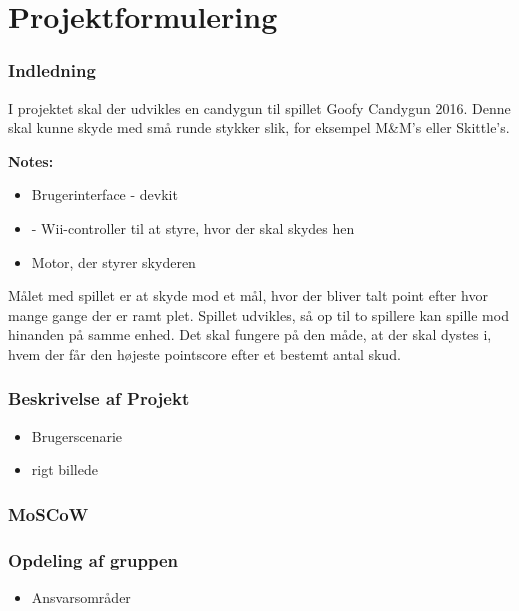 \frontmatter
\maketitle
\newpage

\tableofcontents
\newpage
\listoffigures
\newpage

\mainmatter
\chapter{Projektformulering}
\subsection{Indledning}
I projektet skal der udvikles en candygun til spillet Goofy Candygun 2016. Denne skal kunne skyde med små runde stykker slik, for eksempel M\&M’s eller Skittle’s. 

\textbf{Notes:}
\begin{itemize}
	\item{Brugerinterface - devkit}
	\item{-	Wii-controller til at styre, hvor der skal skydes hen}
	\item{Motor, der styrer skyderen}
\end{itemize}

Målet med spillet er at skyde mod et mål, hvor der bliver talt point efter hvor mange gange der er ramt plet. Spillet udvikles, så op til to spillere kan spille mod hinanden på samme enhed. Det skal fungere på den måde, at der skal dystes i, hvem der får den højeste pointscore efter et bestemt antal skud. 

\subsection{Beskrivelse af Projekt}
\begin{itemize}
	\item{Brugerscenarie}
	\item{rigt billede}
\end{itemize}

\subsection{MoSCoW}

\subsection{Opdeling af gruppen}
\begin{itemize}
	\item{Ansvarsområder}
\end{itemize}